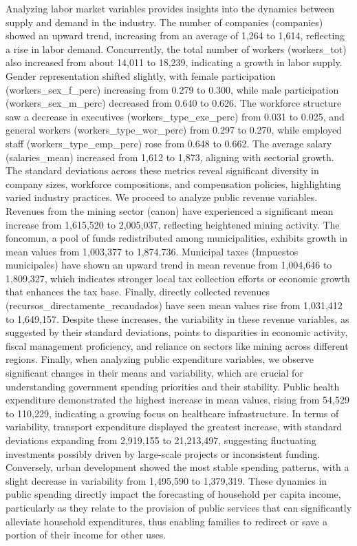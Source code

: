 Analyzing labor market variables provides insights into the dynamics between supply and demand in the industry. The number of companies (companies) showed an upward trend, increasing from an average of 1,264 to 1,614, reflecting a rise in labor demand. Concurrently, the total number of workers (workers_tot) also increased from about 14,011 to 18,239, indicating a growth in labor supply. Gender representation shifted slightly, with female participation (workers_sex_f_perc) increasing from 0.279 to 0.300, while male participation (workers_sex_m_perc) decreased from 0.640 to 0.626. The workforce structure saw a decrease in executives (workers_type_exe_perc) from 0.031 to 0.025, and general workers (workers_type_wor_perc) from 0.297 to 0.270, while employed staff (workers_type_emp_perc) rose from 0.648 to 0.662. The average salary (salaries_mean) increased from 1,612 to 1,873, aligning with sectorial growth. The standard deviations across these metrics reveal significant diversity in company sizes, workforce compositions, and compensation policies, highlighting varied industry practices.
We proceed to analyze public revenue variables. Revenues from the mining sector (canon) have experienced a significant mean increase from 1,615,520 to 2,005,037, reflecting heightened mining activity. The foncomun, a pool of funds redistributed among municipalities, exhibits growth in mean values from 1,003,377 to 1,874,736. Municipal taxes (Impuestos municipales) have shown an upward trend in mean revenue from 1,004,646 to 1,809,327, which indicates stronger local tax collection efforts or economic growth that enhances the tax base. Finally, directly collected revenues (recursos_directamente_recaudados) have seen mean values rise from 1,031,412 to 1,649,157. Despite these increases, the variability in these revenue variables, as suggested by their standard deviations, points to disparities in economic activity, fiscal management proficiency, and reliance on sectors like mining across different regions.
Finally, when analyzing public expenditure variables, we observe significant changes in their means and variability, which are crucial for understanding government spending priorities and their stability. Public health expenditure demonstrated the highest increase in mean values, rising from 54,529 to 110,229, indicating a growing focus on healthcare infrastructure. In terms of variability, transport expenditure displayed the greatest increase, with standard deviations expanding from 2,919,155 to 21,213,497, suggesting fluctuating investments possibly driven by large-scale projects or inconsistent funding. Conversely, urban development showed the most stable spending patterns, with a slight decrease in variability from 1,495,590 to 1,379,319. These dynamics in public spending directly impact the forecasting of household per capita income, particularly as they relate to the provision of public services that can significantly alleviate household expenditures, thus enabling families to redirect or save a portion of their income for other uses.


